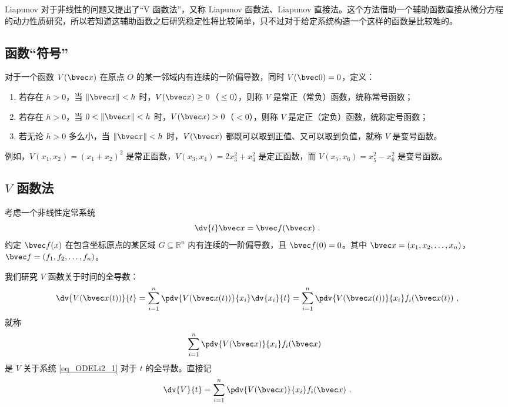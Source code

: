
Liapunov 对于非线性的问题又提出了“V 函数法”，又称 Liapunov 函数法、Liapunov 直接法。这个方法借助一个辅助函数直接从微分方程的动力性质研究，所以若知道这辅助函数之后研究稳定性将比较简单，只不过对于给定系统构造一个这样的函数是比较难的。



\subsection{函数“符号”}
\begin{definition}{}
对于一个函数 $ V(\bvec x)$ 在原点 $O$ 的某一邻域内有连续的一阶偏导数，同时 $ V(\bvec 0 ) = 0$，定义：
\begin{enumerate}
\item 若存在 $h>0$，当 $\Vert \bvec x \Vert < h$ 时，$V(\bvec x) \ge 0$（$\le 0$），则称 $V$ 是常正（常负）函数，统称常号函数；
\item 若存在 $h > 0$，当 $0 < \Vert \bvec x \Vert < h$ 时，$V(\bvec x) > 0$（$< 0$），则称 $V$ 是定正（定负）函数，统称定号函数；
\item 若无论 $h > 0$ 多么小，当 $\Vert \bvec x \Vert < h$ 时，$V(\bvec x)$ 都既可以取到正值、又可以取到负值，就称 $V$ 是变号函数。
\end{enumerate}

\end{definition}

例如，$V(x_1, x_2) = (x_1 + x_2)^2$ 是常正函数，$V(x_3, x_4) = 2 x_3^2 + x_4^2$ 是定正函数，而 $V(x_5, x_6) = x_5^2 - x_6^2$ 是变号函数。

\subsection{$V$ 函数法}
考虑一个非线性定常系统 
\begin{equation}\label{eq_ODELi2_1}
\dv{t} \bvec x = \bvec f(\bvec x) ~.
\end{equation}
约定 $\bvec f(x)$ 在包含坐标原点的某区域 $G \subseteq \mathbb R^n$ 内有连续的一阶偏导数，且 $\bvec f(0) = 0$。其中 $\bvec x = (x_1, x_2, \dots, x_n)$，$\bvec f = (f_1, f_2, \dots, f_n)$。

我们研究 $V$ 函数关于时间的全导数：
\begin{equation}
\dv{V(\bvec x(t))}{t} = \sum_{i=1}^n \pdv{V(\bvec x(t))}{x_i} \dv{x_i}{t} = \sum_{i=1}^n \pdv{V(\bvec x(t))}{x_i} f_i(\bvec x(t)) ~,
\end{equation}
就称 
\begin{equation}
\sum_{i=1}^n \pdv{V(\bvec x)}{x_i} f_i(\bvec x) ~~
\end{equation}
是 $V$ 关于系统 \autoref{eq_ODELi2_1} 对于 $t$ 的全导数。直接记
\begin{equation}
\dv{V}{t} = \sum_{i=1}^n \pdv{V(\bvec x)}{x_i} f_i(\bvec x) ~.
\end{equation}

